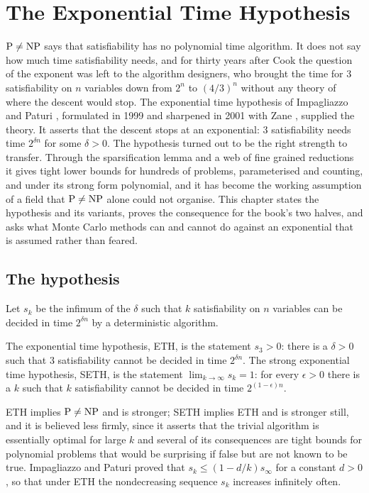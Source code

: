 \chapter{The Exponential Time Hypothesis}
\label{ch:eth}

$\mathrm{P} \ne \mathrm{NP}$ says that satisfiability has no polynomial time algorithm. It does not say how much time satisfiability needs, and for thirty years after Cook the question of the exponent was left to the algorithm designers, who brought the time for $3$ satisfiability on $n$ variables down from $2^n$ to $(4/3)^n$ without any theory of where the descent would stop. The exponential time hypothesis of Impagliazzo and Paturi \cite{IP2001}, formulated in 1999 and sharpened in 2001 with Zane \cite{IPZ2001}, supplied the theory. It asserts that the descent stops at an exponential: $3$ satisfiability needs time $2^{\delta n}$ for some $\delta > 0$. The hypothesis turned out to be the right strength to transfer. Through the sparsification lemma and a web of fine grained reductions it gives tight lower bounds for hundreds of problems, parameterised and counting, and under its strong form polynomial, and it has become the working assumption of a field that $\mathrm{P} \ne \mathrm{NP}$ alone could not organise. This chapter states the hypothesis and its variants, proves the consequence for the book's two halves, and asks what Monte Carlo methods can and cannot do against an exponential that is assumed rather than feared.

\section{The hypothesis}

Let $s_k$ be the infimum of the $\delta$ such that $k$ satisfiability on $n$ variables can be decided in time $2^{\delta n}$ by a deterministic algorithm.

\begin{definition}
The exponential time hypothesis, ETH, is the statement $s_3 > 0$: there is a $\delta > 0$ such that $3$ satisfiability cannot be decided in time $2^{\delta n}$. The strong exponential time hypothesis, SETH, is the statement $\lim_{k \to \infty} s_k = 1$: for every $\epsilon > 0$ there is a $k$ such that $k$ satisfiability cannot be decided in time $2^{(1 - \epsilon) n}$.
\end{definition}

ETH implies $\mathrm{P} \ne \mathrm{NP}$ and is stronger; SETH implies ETH and is stronger still, and it is believed less firmly, since it asserts that the trivial algorithm is essentially optimal for large $k$ and several of its consequences are tight bounds for polynomial problems that would be surprising if false but are not known to be true. Impagliazzo and Paturi \cite{IP2001} proved that $s_k \le (1 - d/k) s_\infty$ for a constant $d > 0$, so that under ETH the nondecreasing sequence $s_k$ increases infinitely often.

